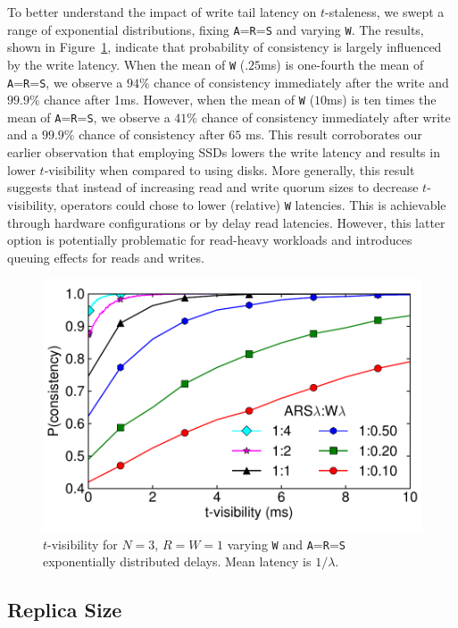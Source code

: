 \documentclass{vldb}
\begin{document}
To better understand the impact of write tail latency on
$t$-staleness, we swept a range of exponential distributions, fixing
\texttt{A}=\texttt{R}=\texttt{S} and varying \texttt{W}.  The results,
shown in Figure~\ref{fig:varydelay}, indicate that probability of
consistency is largely influenced by the write latency. When the mean
of \texttt{W} ($.25$ms) is one-fourth the mean of
\texttt{A}=\texttt{R}=\texttt{S}, we observe a $94\%$ chance of
consistency immediately after the write and $99.9\%$ chance after 1ms.
However, when the mean of \texttt{W} ($10$ms) is ten times the mean of
\texttt{A}=\texttt{R}=\texttt{S}, we observe a $41\%$ chance of
consistency immediately after write and a $99.9\%$ chance of
consistency after $65$ ms. This result corroborates our earlier
observation that employing SSDs lowers the write latency and results
in lower $t$-visibility when compared to using disks.  More generally,
this result suggests that instead of increasing read and write quorum
sizes to decrease $t$-visibility, operators could chose to lower
(relative) \texttt{W} latencies.  This is achievable through hardware
configurations or by delay read latencies.  However, this latter
option is potentially problematic for read-heavy workloads and
introduces queuing effects for reads and writes.

\begin{figure}
\centering
\includegraphics[width=.85\columnwidth]{figs/rwratio.pdf}
\caption{$t$-visibility for $N$$=$$3$, $R$$=$$W$$=$$1$ varying \texttt{W} and \texttt{A}=\texttt{R}=\texttt{S} exponentially distributed delays.  Mean latency is $1/\lambda$.}
\label{fig:varydelay}
\end{figure}

\subsection{Replica Size}
\end{document}
